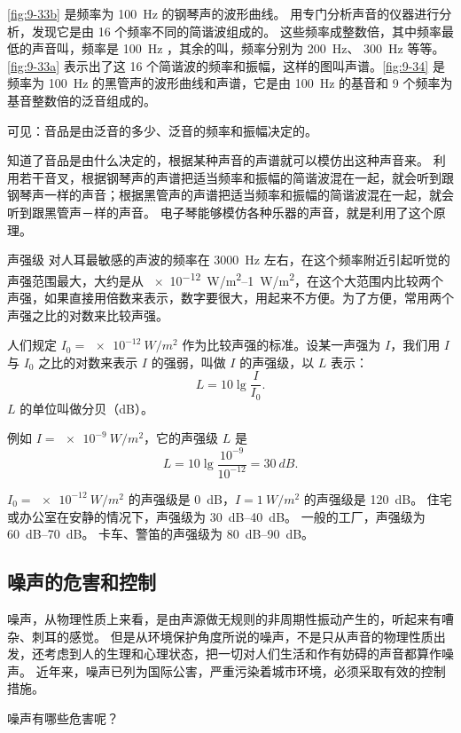 \cref{fig:9-33b} 是频率为 \qty{100}{Hz} 的钢琴声的波形曲线。
用专门分析声音的仪器进行分析，发现它是由 16 个频率不同的简谐波组成的。
这些频率成整数倍，其中频率最低的声音叫，频率是 \qty{100}{Hz} ，其余的叫，频率分别为 \qty{200}{Hz}、 \qty{300}{Hz} 等等。\cref{fig:9-33a} 表示出了这 16 个简谐波的频率和振幅，这样的图叫声谱。\cref{fig:9-34} 是频率为 \qty{100}{Hz} 的黑管声的波形曲线和声谱，它是由 \qty{100}{Hz} 的基音和 9 个频率为基音整数倍的泛音组成的。

可见：音品是由泛音的多少、泛音的频率和振幅决定的。

知道了音品是由什么决定的，根据某种声音的声谱就可以模仿出这种声音来。
利用若干音叉，根据钢琴声的声谱把适当频率和振幅的简谐波混在一起，就会听到跟钢琴声一样的声音；根据黑管声的声谱把适当频率和振幅的简谐波混在一起，就会听到跟黑管声－样的声音。
电子琴能够模仿各种乐器的声音，就是利用了这个原理。

\begin{Reading}{声强级}
对人耳最敏感的声波的频率在 \qty{3000}{Hz} 左右，在这个频率附近引起听觉的声强范围最大，大约是从 \qtyrange{e-12}{1}{W/m^2}，在这个大范围内比较两个声强，如果直接用倍数来表示，数字要很大，用起来不方便。为了方便，常用两个声强之比的对数来比较声强。

人们规定 $I_0=\qty{e-12}{W/m^2}$ 作为比较声强的标准。设某一声强为 $I$，我们用 $I$ 与 $I_0$ 之比的对数来表示 $I$ 的强弱，叫做 $I$ 的声强级，以 $L$ 表示：
\[L=10\lg \frac{I}{I_0}.\]
$L$ 的单位叫做分贝（\unit{dB}）。

例如 $I=\qty{e-9}{W/m^2}$，它的声强级 $L$ 是
\[L=10\lg \frac{10^{-9}}{10^{-12}}=\qty{30}{dB}.\]

$I_0=\qty{e-12}{W/m^2}$ 的声强级是 \qty{0}{dB}，$I=\qty{1}{W/m^2}$ 的声强级是 \qty{120}{dB}。
住宅或办公室在安静的情况下，声强级为 \qtyrange{30}{40}{dB}。
一般的工厂，声强级为 \qtyrange{60}{70}{dB}。
卡车、警笛的声强级为 \qtyrange{80}{90}{dB}。
\end{Reading}

\subsection{噪声的危害和控制}
噪声，从物理性质上来看，是由声源做无规则的非周期性振动产生的，听起来有嘈杂、刺耳的感觉。
但是从环境保护角度所说的噪声，不是只从声音的物理性质出发，还考虑到人的生理和心理状态，把一切对人们生活和作有妨碍的声音都算作噪声。
近年来，噪声已列为国际公害，严重污染着城市环境，必须采取有效的控制措施。

噪声有哪些危害呢？


